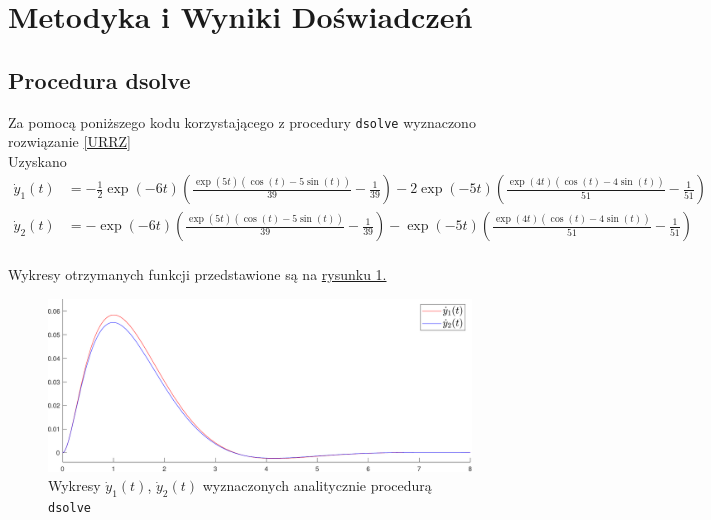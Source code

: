 \documentclass[a4paper, 12pt, twoside, openany]{article}
\begin{document}
    \newpage

    \section{Metodyka i Wyniki Doświadczeń}
    \subsection{Procedura dsolve}
    Za pomocą poniższego kodu korzystającego z procedury \texttt{dsolve} wyznaczono rozwiązanie \eqref{URRZ} \\[-1em]
    
    Uzyskano
    \small
    $$ \begin{aligned}
    \dot{y}_1(t) &= - \frac{1}{2}\exp(-6 t) \left( \frac{\exp(5 t) \left( \cos(t) - 5 \sin(t) \right)}{39} - \frac{1}{39} \right) - 2 \exp(-5 t) \left( \frac{\exp(4 t) \left( \cos(t) - 4 \sin(t) \right)}{51} - \frac{1}{51} \right) \\
    \dot{y}_2(t) &= - \exp(-6 t) \left( \frac{\exp(5 t) \left( \cos(t) - 5 \sin(t) \right)}{39} - \frac{1}{39} \right) - \exp(-5 t) \left( \frac{\exp(4 t) \left( \cos(t) - 4 \sin(t) \right)}{51} - \frac{1}{51} \right)
    \end{aligned} $$\\
    Wykresy otrzymanych funkcji przedstawione są na \hyperref[fig:rys1]{rysunku 1.}
    \begin{figure}[H]
        \centering
        \includegraphics[width=\linewidth]{exact.pdf}
        \caption{Wykresy $\dot{y}_1(t)$, $\dot{y}_2(t)$ wyznaczonych analitycznie procedurą \texttt{dsolve} }
        \label{fig:rys1} %
    \end{figure}
\end{document}
